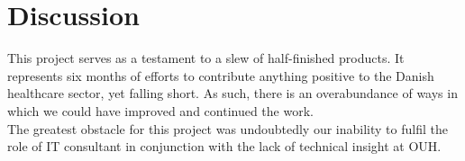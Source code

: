 \section{Discussion}
This project serves as a testament to a slew of half-finished products. It represents six months of efforts to contribute anything positive to the Danish healthcare sector, yet falling short. As such, there is an overabundance of ways in which we could have improved and continued the work.
\\
The greatest obstacle for this project was undoubtedly our inability to fulfil the role of IT consultant in conjunction with the lack of technical insight at OUH.